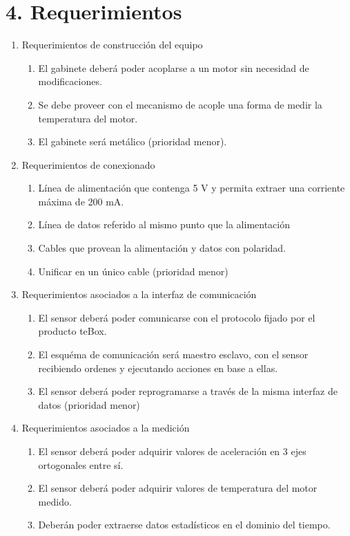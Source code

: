 \documentclass[11pt]{charter}
\begin{document}
\section{4. Requerimientos}
\label{sec:requerimientos}

\begin{enumerate}
\item Requerimientos de construcción del equipo
	\begin{enumerate}
	\item El gabinete deberá poder acoplarse a un motor sin necesidad de modificaciones.
	\item Se debe proveer con el mecanismo de acople una forma de medir la temperatura del motor.
	\item El gabinete será metálico (prioridad menor).
	\end{enumerate}
\item Requerimientos de conexionado
	\begin{enumerate}
	\item Línea de alimentación que contenga 5 V y permita extraer una corriente máxima de 200 mA.
	\item Línea de datos referido al mismo punto que la alimentación
	\item Cables que provean la alimentación y datos con polaridad.
	\item Unificar en un único cable (prioridad menor)
	\end{enumerate}
\item Requerimientos asociados a la interfaz de comunicación
	\begin{enumerate}
	\item El sensor deberá poder comunicarse con el protocolo fijado por el producto teBox.
	\item El esquéma de comunicación será maestro esclavo, con el sensor recibiendo ordenes y ejecutando acciones en base a ellas.
	\item El sensor deberá poder reprogramarse a través de la misma interfaz de datos (prioridad menor)
	\end{enumerate}
\item Requerimientos asociados a la medición
	\begin{enumerate}
	\item El sensor deberá poder adquirir valores de aceleración en 3 ejes ortogonales entre sí.
	\item El sensor deberá poder adquirir valores de temperatura del motor medido.
	\item Deberán poder extraerse datos estadísticos en el dominio del tiempo.

\end{enumerate}
\end{enumerate}
\end{document}
